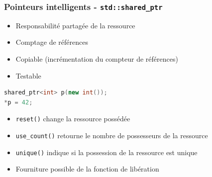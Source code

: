 \documentclass[C++.tex]{subfiles}
\begin{document}
\begin{frame}[fragile]
	\frametitle{Pointeurs intelligents - \lstinline|std::shared_ptr|}
	\begin{itemize}
		\item Responsabilité partagée de la ressource
		\item Comptage de références
		\item Copiable (incrémentation du compteur de références)
		\item Testable
	\end{itemize}

	\begin{lstlisting}[language=C++]
shared_ptr<int> p(new int());
*p = 42;\end{lstlisting}

	\begin{itemize}
		\item \lstinline|reset()| change la ressource possédée


		\item \lstinline|use_count()| retourne le nombre de possesseurs de la ressource
		\item \lstinline|unique()| indique si la possession de la ressource est unique
		\item Fourniture possible de la fonction de libération
	\end{itemize}
\end{frame}
\end{document}
